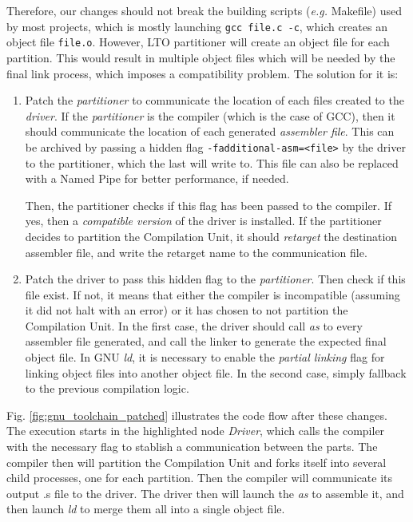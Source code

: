 \documentclass[runningheads]{llncs}
\begin{document}
Therefore, our changes should not break the building scripts (\textit{e.g.} Makefile)
used by most
projects, which is mostly launching \texttt{gcc file.c -c}, which creates
an object file \texttt{file.o}. However, LTO partitioner will create an object file for each partition. This
would result in multiple object files which will be needed by the final
link process, which imposes a compatibility problem. The solution for it is:
\begin{enumerate}
	\item Patch the \textit{partitioner} to communicate the location of
	each files created to the \textit{driver}. If the \textit{partitioner}
	is the compiler (which is the case of GCC), then it should communicate
	the location of each generated \textit{assembler file}. This can be
	archived by passing a hidden flag \texttt{-fadditional-asm=<file>}
	by the driver to the partitioner, which the last will write to. This file can also
	be replaced with a Named Pipe for better performance, if needed.

	Then, the partitioner checks if this flag has been passed to the compiler. If yes, then
	a \textit{compatible version} of the driver is installed. If the
	partitioner decides to partition the Compilation Unit, it should
	\textit{retarget} the destination assembler file, and write the retarget
	name to the communication file.

	\item Patch the driver to pass this hidden flag to the
	\textit{partitioner}.  Then check if this file exist. If not, it means that
	either the compiler is incompatible (assuming it did not halt with an
	error) or it has chosen to not partition the Compilation Unit. In the first
	case, the driver should call \textit{as} to every assembler file generated, and call
	the linker to generate the expected final object file. In GNU \textit{ld},
	it is necessary to enable the \textit{partial linking} flag for linking
	object files into another object file. In the second case, simply fallback
	to the previous compilation logic.
\end{enumerate}

Fig. \ref{fig:gnu_toolchain_patched} illustrates the code flow after these
changes.  The execution starts in the highlighted node \textit{Driver}, which
calls the compiler with the necessary flag to stablish a communication between
the parts. The compiler then will partition the Compilation Unit and forks
itself into several child processes, one for each partition. Then the compiler
will communicate its output .s file to the driver. The driver then will launch the
\textit{as} to assemble it, and then launch \textit{ld} to merge them all into
a single object file.
\end{document}
